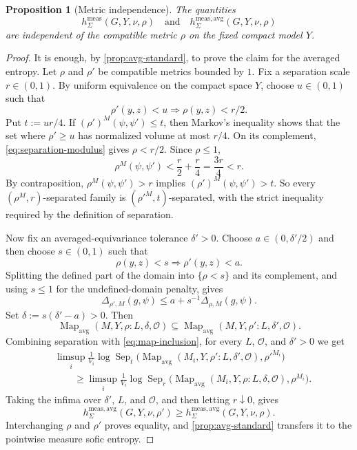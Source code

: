 \documentclass[12pt]{amsart}
\newtheorem{proposition}[proposition]{Proposition}
\theoremstyle{definition}
\newcommand{\Mapavg}{\operatorname{Map}_{\mathrm{avg}}}
\newcommand{\Sep}{\operatorname{Sep}}
\newcommand{\cO}{\mathcal O}
\newcommand{\1}{\mathbf 1}
\begin{document}
\begin{proposition}[Metric independence]\label{prop:compact-entropy-invariance}
	The quantities
	\[
	h^{\mathrm{meas}}_{\Sigma}(G,Y,\nu,\rho)
	\quad\text{and}\quad
	h^{\mathrm{meas,avg}}_{\Sigma}(G,Y,\nu,\rho)
	\]
	are independent of the compatible metric $\rho$ on the fixed compact model $Y$.
\end{proposition}

\begin{proof}
	It is enough, by \cref{prop:avg-standard}, to prove the claim for the averaged entropy. Let $\rho$ and $\rho'$ be compatible metrics bounded by $1$. Fix a separation scale $r\in(0,1)$. By uniform equivalence on the compact space $Y$, choose $u\in(0,1)$ such that
	\begin{equation}\label{eq:separation-modulus}
		\rho'(y,z)<u\Longrightarrow \rho(y,z)<r/2.
	\end{equation}
	Put $t:=ur/4$. If $(\rho')^M(\psi,\psi')\leq t$, then Markov's
inequality shows that the set where $\rho'\geq u$ has normalized volume
at most $r/4$. On its complement, \eqref{eq:separation-modulus} gives
$\rho<r/2$. Since $\rho\leq1$,
\[
\rho^M(\psi,\psi')<\frac r2+\frac r4=\frac{3r}{4}<r.
\]
By contraposition, $\rho^M(\psi,\psi')>r$ implies
$(\rho')^M(\psi,\psi')>t$. So every
$(\rho^M,r)$-separated family is $(\rho'^M,t)$-separated, with the
strict inequality required by the definition of separation.
	
	Now fix an averaged-equivariance tolerance $\delta'>0$. Choose $a\in(0,\delta'/2)$ and then choose $s\in(0,1)$ such that
	\begin{equation}\label{eq:equivariance-modulus}
		\rho(y,z)<s\Longrightarrow \rho'(y,z)<a.
	\end{equation}
	Splitting the defined part of the domain into $\{\rho<s\}$ and its complement, and using $s\leq1$ for the undefined-domain penalty, gives
	\begin{equation}\label{eq:defect-comparison}
		\Delta_{\rho',M}(g,\psi)
		\leq a+s^{-1}\Delta_{\rho,M}(g,\psi).
	\end{equation}
	Set $\delta:=s(\delta'-a)>0$. Then
	\begin{equation}\label{eq:map-inclusion}
		\Mapavg(M,Y,\rho:L,\delta,\cO)
		\subseteq
		\Mapavg(M,Y,\rho':L,\delta',\cO).
	\end{equation}
	Combining separation with \eqref{eq:map-inclusion}, for every $L$, $\cO$, and $\delta'>0$ we get
	\begin{align*}
		&\limsup_i\frac1{V_i}
		\log\Sep_t\bigl(\Mapavg(M_i,Y,\rho':L,\delta',\cO),\rho'^{M_i}\bigr)\\
		&\qquad\geq
		\limsup_i\frac1{V_i}
		\log\Sep_r\bigl(\Mapavg(M_i,Y,\rho:L,\delta,\cO),\rho^{M_i}\bigr).
	\end{align*}
	Taking the infima over $\delta'$, $L$, and $\cO$, and then letting $r\downarrow0$, gives
	\[
	h^{\mathrm{meas,avg}}_{\Sigma}(G,Y,\nu,\rho')
	\geq h^{\mathrm{meas,avg}}_{\Sigma}(G,Y,\nu,\rho).
	\]
	Interchanging $\rho$ and $\rho'$ proves equality, and \cref{prop:avg-standard} transfers it to the pointwise measure sofic entropy.
\end{proof}
\end{document}
